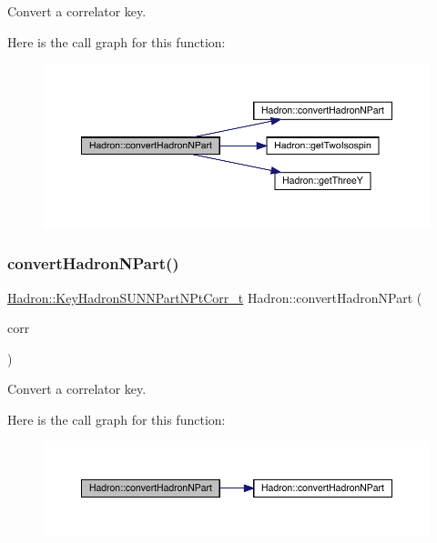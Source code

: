 Convert a correlator key. 

Here is the call graph for this function\+:\nopagebreak
\begin{figure}[H]
\begin{center}
\leavevmode
\includegraphics[width=350pt]{d1/daf/namespaceHadron_a870585feaeca280be18774aa6242e2e9_cgraph}
\end{center}
\end{figure}
\mbox{\label{namespaceHadron_af69200410e93c702cf9e19f0c220bbef}} 
\subsubsection{\texorpdfstring{convertHadronNPart()}{convertHadronNPart()}\hspace{0.1cm}{\footnotesize\ttfamily [3/3]}}
{\footnotesize\ttfamily \mbox{\hyperlink{structHadron_1_1KeyHadronSUNNPartNPtCorr__t}{Hadron\+::\+Key\+Hadron\+S\+U\+N\+N\+Part\+N\+Pt\+Corr\+\_\+t}} Hadron\+::convert\+Hadron\+N\+Part (\begin{DoxyParamCaption}\item[{const \mbox{\hyperlink{structHadron_1_1KeyHadronNPartNPtCorr__t}{Key\+Hadron\+N\+Part\+N\+Pt\+Corr\+\_\+t}} \&}]{corr }\end{DoxyParamCaption})}



Convert a correlator key. 

Here is the call graph for this function\+:\nopagebreak
\begin{figure}[H]
\begin{center}
\leavevmode
\includegraphics[width=350pt]{d1/daf/namespaceHadron_af69200410e93c702cf9e19f0c220bbef_cgraph}
\end{center}
\end{figure}
\mbox{\label{namespaceHadron_acca1db731e7341c6fce2d78c3442c739}} 
